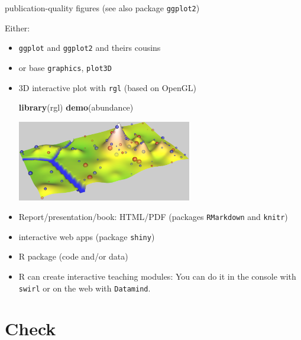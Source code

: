 \documentclass[8pt,ignorenonframetext,]{beamer}
\newenvironment{Shaded}{\begin{snugshade}}{\end{snugshade}}
\newcommand{\KeywordTok}[1]{\textcolor[rgb]{0.13,0.29,0.53}{\textbf{{#1}}}}
\newcommand{\NormalTok}[1]{{#1}}
\begin{document}
\begin{frame}[fragile]{publication-quality figures (see also package
\texttt{ggplot2})}

Either:

\begin{itemize}
\item
  \texttt{ggplot} and \texttt{ggplot2} and theirs cousins
\item
  or base \texttt{graphics}, \texttt{plot3D}
\item
  3D interactive plot with \texttt{rgl} (based on OpenGL)

\begin{Shaded}
\begin{Highlighting}[]
\KeywordTok{library}\NormalTok{(rgl)}
\KeywordTok{demo}\NormalTok{(abundance) }
\end{Highlighting}
\end{Shaded}

  \includegraphics[width=0.60000\textwidth]{imgPres/rgl_demo.png}
\item
  Report/presentation/book: HTML/PDF (packages \texttt{RMarkdown} and
  \texttt{knitr})
\item
  interactive web apps (package \texttt{shiny})
\item
  R package (code and/or data)
\item
  R can create interactive teaching modules: You can do it in the
  console with \texttt{swirl} or on the web with \texttt{Datamind}.
\end{itemize}

\end{frame}

\section{Check}\label{check}
\end{document}
